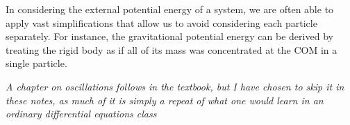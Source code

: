 In considering the external potential energy of a system, we are often able to apply vast simplifications that allow us to avoid considering each particle separately. For instance, the gravitational potential energy can be derived by treating the rigid body as if all of its mass was concentrated at the COM in a single particle.

\textit{A chapter on oscillations follows in the textbook, but I have chosen to skip it in these notes, as much of it is simply a repeat of what one would learn in an ordinary differential equations class}